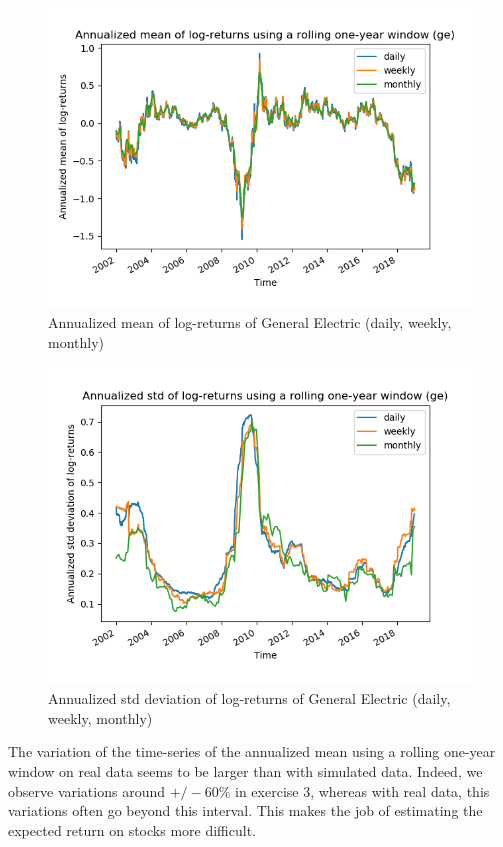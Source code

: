 \documentclass[10pt]{article}
\newenvironment{exercise}[2][Exercise]{\begin{trivlist}
  \item[\hskip \labelsep {\bfseries #1}\hskip \labelsep {\bfseries #2.}]}{\end{trivlist}}
\begin{document}
\begin{exercise}{4}
\begin{figure}[H]
		\centering
		\includegraphics[scale=0.5]{Figures/problem4d_mean_ge.png}	
		\caption{Annualized mean of log-returns of General Electric (daily, weekly, monthly)}	
		\label{fig:problem3d_men_ge}
	
	\end{figure}
	
	\begin{figure}[H]
	
		\centering
		\includegraphics[scale=0.5]{Figures/problem4d_std_ge.png}	
		\caption{Annualized std deviation of log-returns of General Electric (daily, weekly, monthly)}	
		\label{fig:problem3d_std_ge}
	
	\end{figure} 
	
	The variation of the time-series of the annualized mean using a rolling one-year window on real data seems to be larger than with simulated data. Indeed, we observe variations around $+/- 60\%$ in exercise 3, whereas with real data, this variations often go beyond this interval. This makes the job of estimating the expected return on stocks more difficult.  
 

\end{exercise}
\end{document}

